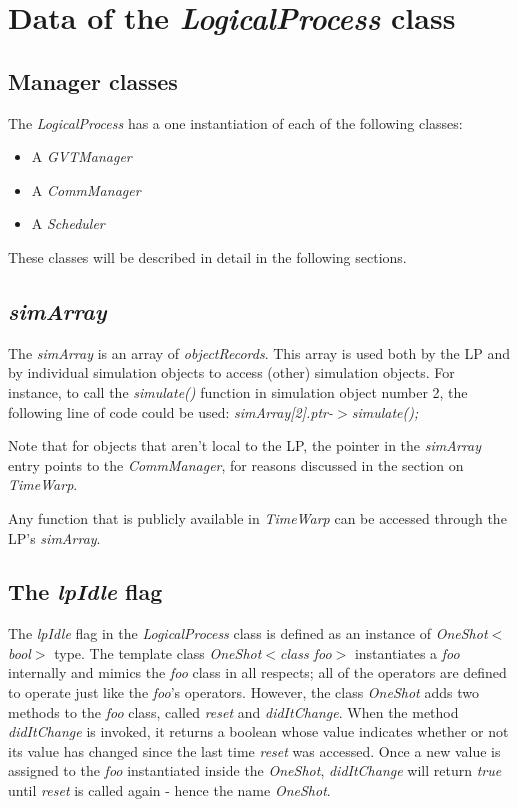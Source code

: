 \documentclass[11pt]{report}
\begin{document}
\section{Data of the {\it LogicalProcess} class}

\subsection{Manager classes}
The {\it LogicalProcess} has a one instantiation of each of the
following classes:
\begin{itemize}	
\item
A {\it GVTManager}
\item	
A {\it CommManager}  
\item
A {\it Scheduler}
\end{itemize}

These classes will be described in detail in the following sections.

\subsection{{\it simArray}}

The {\it simArray} is an array of {\it objectRecords}.  This array is used
both by the LP and by individual simulation objects to access (other)
simulation objects.  For instance, to call the {\it simulate()} function
in simulation object number 2, the following line of code could be used:
{\it simArray[2].ptr-$>$simulate();}

Note that for objects that aren't local to the LP, the pointer in the {\it
simArray} entry points to the {\it CommManager}, for reasons discussed in
the section on {\it TimeWarp}.

Any function that is publicly available in {\it TimeWarp} can be
accessed through the LP's {\it simArray}.

\subsection{The {\it lpIdle} flag}
The {\it lpIdle} flag in the {\it LogicalProcess} class is defined as an
instance of {\it OneShot$<$bool$>$} type.  The template class {\it
OneShot$<$class foo$>$} instantiates a {\it foo} internally and mimics the
{\it foo} class in all respects; all of the operators are defined to
operate just like the {\it foo}'s operators.  However, the class {\it
OneShot} adds two methods to the {\it foo} class, called {\it reset} and
{\it didItChange}.  When the method {\it didItChange} is invoked, it
returns a boolean whose value indicates whether or not its value has
changed since the last time {\it reset} was accessed.  Once a new value is
assigned to the {\it foo} instantiated inside the {\it OneShot}, {\it
didItChange} will return {\it true} until {\it reset} is called again -
hence the name {\it OneShot}.
\end{document}
